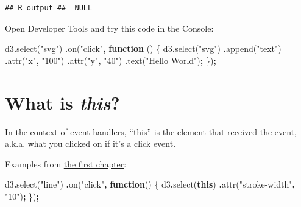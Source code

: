 \documentclass[
  openany]{book}
\newenvironment{Shaded}{\begin{snugshade}}{\end{snugshade}}
\newcommand{\FunctionTok}[1]{\textcolor[rgb]{0.00,0.00,0.00}{#1}}
\newcommand{\KeywordTok}[1]{\textcolor[rgb]{0.13,0.29,0.53}{\textbf{#1}}}
\newcommand{\NormalTok}[1]{#1}
\newcommand{\OperatorTok}[1]{\textcolor[rgb]{0.81,0.36,0.00}{\textbf{#1}}}
\newcommand{\StringTok}[1]{\textcolor[rgb]{0.31,0.60,0.02}{#1}}
\begin{document}
\begin{verbatim}
## R output ##  NULL
\end{verbatim}

Open Developer Tools and try this code in the Console:

\begin{Shaded}
\begin{Highlighting}[]
\NormalTok{d3}\OperatorTok{.}\FunctionTok{select}\NormalTok{(}\StringTok{"svg"}\NormalTok{)}
  \OperatorTok{.}\FunctionTok{on}\NormalTok{(}\StringTok{"click"}\OperatorTok{,} \KeywordTok{function}\NormalTok{ () \{}
\NormalTok{    d3}\OperatorTok{.}\FunctionTok{select}\NormalTok{(}\StringTok{"svg"}\NormalTok{)}
      \OperatorTok{.}\FunctionTok{append}\NormalTok{(}\StringTok{"text"}\NormalTok{)}
        \OperatorTok{.}\FunctionTok{attr}\NormalTok{(}\StringTok{"x"}\OperatorTok{,} \StringTok{"100"}\NormalTok{)}
        \OperatorTok{.}\FunctionTok{attr}\NormalTok{(}\StringTok{"y"}\OperatorTok{,} \StringTok{"40"}\NormalTok{)}
        \OperatorTok{.}\FunctionTok{text}\NormalTok{(}\StringTok{"Hello World"}\NormalTok{)}\OperatorTok{;}
\NormalTok{        \})}\OperatorTok{;}
\end{Highlighting}
\end{Shaded}

\hypertarget{what-is-this}{%
\section{\texorpdfstring{What is \emph{this}?}{What is this?}}\label{what-is-this}}

In the context of event handlers, ``this'' is the element that received the event, a.k.a. what you clicked on if it's a click event.

Examples from \href{jump.html\#interactivity}{the first chapter}:

\begin{Shaded}
\begin{Highlighting}[]
\NormalTok{d3}\OperatorTok{.}\FunctionTok{select}\NormalTok{(}\StringTok{"line"}\NormalTok{)}
  \OperatorTok{.}\FunctionTok{on}\NormalTok{(}\StringTok{"click"}\OperatorTok{,} \KeywordTok{function}\NormalTok{() \{}
\NormalTok{    d3}\OperatorTok{.}\FunctionTok{select}\NormalTok{(}\KeywordTok{this}\NormalTok{)}
      \OperatorTok{.}\FunctionTok{attr}\NormalTok{(}\StringTok{"stroke{-}width"}\OperatorTok{,} \StringTok{"10"}\NormalTok{)}\OperatorTok{;}
\NormalTok{      \})}\OperatorTok{;}
\end{Highlighting}
\end{Shaded}
\end{document}
